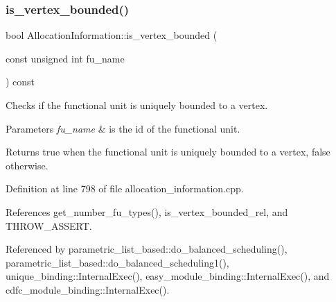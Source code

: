 \subsubsection{\texorpdfstring{is\+\_\+vertex\+\_\+bounded()}{is\_vertex\_bounded()}}
{\footnotesize\ttfamily bool Allocation\+Information\+::is\+\_\+vertex\+\_\+bounded (\begin{DoxyParamCaption}\item[{const unsigned int}]{fu\+\_\+name }\end{DoxyParamCaption}) const}



Checks if the functional unit is uniquely bounded to a vertex. 


\begin{DoxyParams}{Parameters}
{\em fu\+\_\+name} & is the id of the functional unit. \\
\hline
\end{DoxyParams}
\begin{DoxyReturn}{Returns}
true when the functional unit is uniquely bounded to a vertex, false otherwise. 
\end{DoxyReturn}


Definition at line 798 of file allocation\+\_\+information.\+cpp.



References get\+\_\+number\+\_\+fu\+\_\+types(), is\+\_\+vertex\+\_\+bounded\+\_\+rel, and T\+H\+R\+O\+W\+\_\+\+A\+S\+S\+E\+RT.



Referenced by parametric\+\_\+list\+\_\+based\+::do\+\_\+balanced\+\_\+scheduling(), parametric\+\_\+list\+\_\+based\+::do\+\_\+balanced\+\_\+scheduling1(), unique\+\_\+binding\+::\+Internal\+Exec(), easy\+\_\+module\+\_\+binding\+::\+Internal\+Exec(), and cdfc\+\_\+module\+\_\+binding\+::\+Internal\+Exec().

